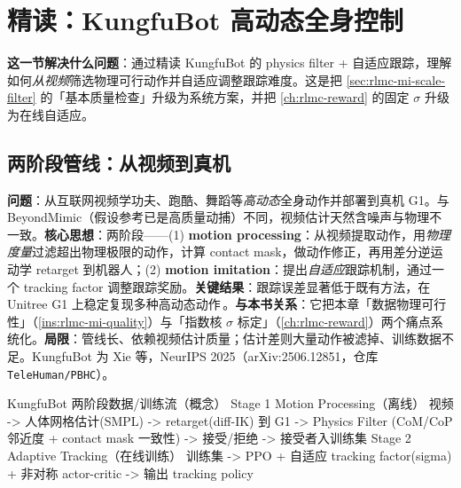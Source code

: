 \section{精读：KungfuBot 高动态全身控制}
\label{sec:rlmc-mi-kungfu}

\textbf{这一节解决什么问题}：通过精读 KungfuBot 的 physics filter + 自适应跟踪，理解如何\emph{从视频}筛选物理可行动作并自适应调整跟踪难度。这是把 \cref{sec:rlmc-mi-scale-filter} 的「基本质量检查」升级为系统方案，并把 \cref{ch:rlmc-reward} 的固定 $\sigma$ 升级为在线自适应。

\subsection{两阶段管线：从视频到真机}
\label{sec:rlmc-mi-kungfu-pipeline}

\begin{paper}\label{paper:rlmc-mi-kungfu}
\textbf{问题}：从互联网视频学功夫、跑酷、舞蹈等\emph{高动态}全身动作并部署到真机 G1。与 BeyondMimic（假设参考已是高质量动捕）不同，视频估计天然含噪声与物理不一致。\textbf{核心思想}：两阶段——(1) \textbf{motion processing}：从视频提取动作，用\emph{物理度量}过滤超出物理极限的动作，计算 contact mask，做动作修正，再用差分逆运动学 retarget 到机器人；(2) \textbf{motion imitation}：提出\emph{自适应}跟踪机制，通过一个 tracking factor 调整跟踪奖励。\textbf{关键结果}：跟踪误差显著低于既有方法，在 Unitree G1 上稳定复现多种高动态动作\,\cite{xie2025kungfubot}。\textbf{与本书关系}：它把本章「数据物理可行性」（\cref{ins:rlmc-mi-quality}）与「指数核 $\sigma$ 标定」（\cref{ch:rlmc-reward}）两个痛点系统化。\textbf{局限}：管线长、依赖视频估计质量；估计差则大量动作被滤掉、训练数据不足。KungfuBot 为 Xie 等，NeurIPS 2025（arXiv:2506.12851，仓库 \texttt{TeleHuman/PBHC}）。
\end{paper}

\begin{codebox}[text]{KungfuBot 两阶段数据/训练流（概念）}
Stage 1 Motion Processing（离线）
  视频 -> 人体网格估计(SMPL) -> retarget(diff-IK) 到 G1
      -> Physics Filter (CoM/CoP 邻近度 + contact mask 一致性)
      -> 接受/拒绝 -> 接受者入训练集
Stage 2 Adaptive Tracking（在线训练）
  训练集 -> PPO + 自适应 tracking factor(sigma) + 非对称 actor-critic
      -> 输出 tracking policy
\end{codebox}

